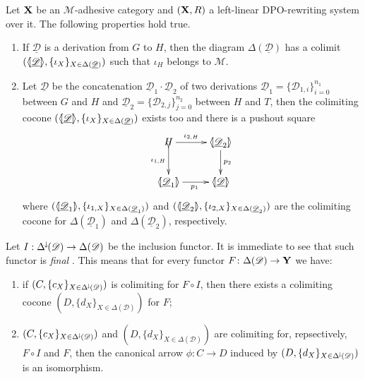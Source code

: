 \documentclass[a4paper,UKenglish,cleveref,pdftex, thm-restate,numberwithinsect]{lipics}
\newcommand{\Deltamin}{\Delta^{\hspace{-1pt}\downarrow\hspace{-1pt}}}
\def\R{\mathsf{R}}
\def\X{\textbf {\textup{X}}}
\def\Y{\textbf {\textup{Y}}}
\newcommand{\dder}[1]{\mathscr{#1}}
\newcommand{\der}[1]{\underline{\dder{#1}}}
\newcommand{\lpro}{\langle \hspace{-1.85pt}[}
\newcommand{\rpro}{]\hspace{-1.85pt}\rangle}
\newcommand{\tpro}[1]{\lpro \der{#1}\rpro}
\newcommand{\tproi}[2]{\lpro \der{#1}_{#2}\rpro}
\begin{document}
\begin{lemma}\label{lem:colim}
	Let $\X$ be an $\mathcal{M}$-adhesive category and $(\X, \R)$ a left-linear DPO-rewriting system over it. The following properties hold true.
	\begin{enumerate}
		\item  If $\der{D}$ is a derivation from $G$ to $H$, then the diagram $\Delta(\der{D})$ has a colimit $(\tpro{D}, \{\iota_X\}_{X\in \Delta(\der{D})})$ such that $\iota_H$ belongs to $\mathcal{M}$.
		\item Let $\der{D}$ be the concatenation $\der{D}_1\cdot \der{D}_2$ of two derivations $\der{D}_1=\{\dder{D}_{1,i}\}_{i=0}^{n_1}$ between $G$ and $H$ and $\der{D}_2=\{\dder{D}_{2,j}\}_{j=0}^{n_2}$ between $H$ and $T$,  then the colimiting cocone $(\tpro{D}, \{\iota_X\}_{X\in \Delta(\der{D})})$ exists too and there is a pushout square
		\[\xymatrix{H\ar[r]^-{\iota_{2, H}} \ar@{>->}[d]_-{\iota_{1, H}} & \tproi{D}{2} \ar[d]^{p_2}\\  \tproi{D}{1} \ar[r]_{p_1}& \tpro{D}}\]
		where $(\tproi{D}{1}, \{\iota_{1, X}\}_{X\in \Delta(\der{D}_1)})$ and $(\tproi{D}{2}, \{\iota_{2, X}\}_{X\in \Delta(\der{D}_2)})$ are the colimiting cocone for $\Delta(\der{D}_1)$ and $\Delta(\der{D}_2)$, respectively.
	\end{enumerate}
\end{lemma}
\begin{remark}\label{rem:cof}
Let $I:\Deltamin(\dder{D})\to \Delta(\dder{D})$ be the inclusion functor. It is immediate to see that such functor is \emph{final} \cite{mac2013categories}. This means that for every functor $F\colon \Delta(\dder{D})\to \Y$ we have:
\begin{enumerate}
	\item if  $(C, \{c_X\}_{X\in \Deltamin(\dder{D})})$ is colimiting for $F\circ I$, then there exists a colimiting cocone $(D, \{d_X\}_{X\in \Delta(\dder{D})})$ for $F$;
	\item $(C, \{c_X\}_{X\in \Deltamin(\dder{D})})$ and $(D, \{d_X\}_{X\in \Delta(\dder{D})})$ are colimiting for, repsectively, $F\circ I$ and $F$, then the canonical arrow $\phi\colon C\to D$ induced by $(D, \{d_X\}_{X\in \Deltamin(\dder{D})})$ is an isomorphism.
\end{enumerate}
\end{remark}
\end{document}
